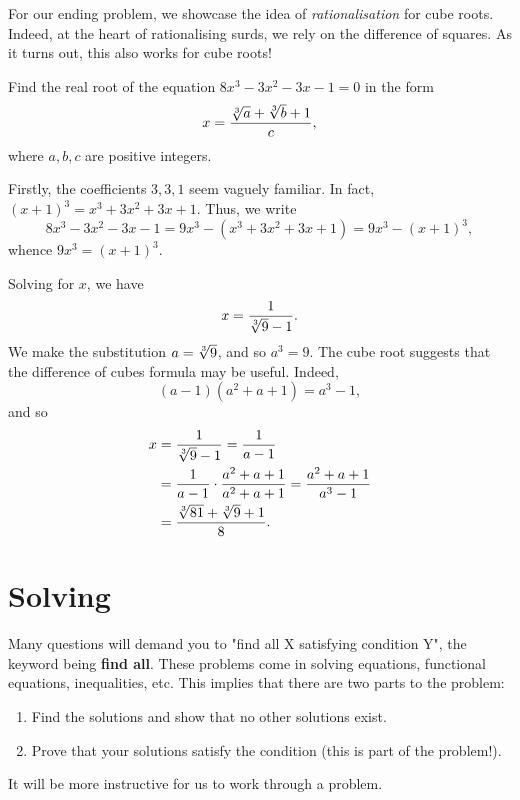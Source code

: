 \documentclass[../jarvis.tex]{subfiles}
\begin{document}
For our ending problem, we showcase the idea of \textit{rationalisation} for cube roots. Indeed, at the heart of rationalising surds, we rely on the difference of squares. As it turns out, this also works for cube roots! 
\begin{example}[2013 AIME II/5]
    Find the real root of the equation $8x^3-3x^2-3x-1=0$ in the form 
    $$x=\frac{\sqrt[3]{a}+\sqrt[3]{b}+1}{c},$$
    where $a,b,c$ are positive integers.
\end{example}
Firstly, the coefficients $3, 3, 1$ seem vaguely familiar. In fact, $(x+1)^3=x^3+3x^2+3x+1$. Thus, we write
$$8x^3-3x^2-3x-1=9x^3-(x^3+3x^2+3x+1)=9x^3-(x+1)^3,$$
whence $9x^3=(x+1)^3$.

Solving for $x$, we have $$x=\frac{1}{\sqrt[3]{9}-1}.$$ We make the substitution $a=\sqrt[3]{9}$, and so $a^3=9$. The cube root suggests that the difference of cubes formula may be useful. Indeed, $$(a-1)(a^2+a+1)=a^3-1,$$ and so
\begin{align*}
    x&=\frac{1}{\sqrt[3]{9}-1}=\frac{1}{a-1} \\
    &=\frac{1}{a-1}\cdot \frac{a^2+a+1}{a^2+a+1}=\frac{a^2+a+1}{a^3-1} \\
    &=\frac{\sqrt[3]{81}+\sqrt[3]{9}+1}{8}.
\end{align*}

\section{ Solving}
Many questions will demand you to "find all X satisfying condition Y", the keyword being \textbf{find all}. These problems come in solving equations, functional equations, inequalities, etc. This implies that there are two parts to the problem: 
\begin{enumerate}
    \item Find the solutions and show that no other solutions exist.
    \item Prove that your solutions satisfy the condition (this is part of the problem!).
\end{enumerate}
It will be more instructive for us to work through a problem.
\end{document}
